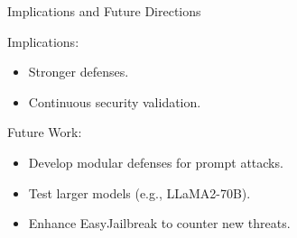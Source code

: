\documentclass{beamer}
\begin{document}
\begin{frame}{Implications and Future Directions}

    \begin{block}{Implications:}
        \begin{itemize}
            \item \small{Stronger defenses.} \pause
            \item \small{Continuous security validation.} \pause
        \end{itemize}
    \end{block}




    \begin{block}{Future Work:}
        \begin{itemize}
            \item \small{Develop modular defenses for prompt attacks.} \pause
            \item \small{Test larger models (e.g., LLaMA2-70B).} \pause
            \item \small{Enhance EasyJailbreak to counter new threats.}
        \end{itemize}
    \end{block}
\end{frame}
\end{document}
